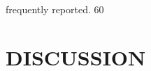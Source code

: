 \documentclass[14pt]{article}
\begin{document}
frequently reported. 60%

\section{DISCUSSION}
\end{document}
